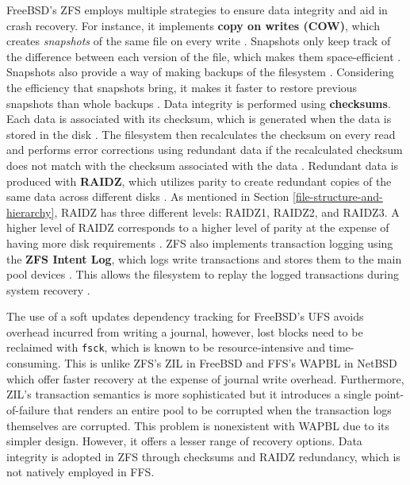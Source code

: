 FreeBSD's ZFS employs multiple strategies to ensure data integrity and aid in crash recovery. For instance, it implements
\textbf{copy on writes (COW)}, which creates \textit{snapshots} of the same file on every write \parencites{pasek2025}{freebsd_zfs}.
Snapshots only keep track of the difference between each version of the file, which makes them space-efficient \parencite{freebsd_zfs}.
Snapshots also provide a way of making backups of the filesystem \parencite{freebsd_zfs}. Considering the efficiency that
snapshots bring, it makes it faster to restore previous snapshots than whole backups \parencite{freebsd_zfs}. Data integrity is
performed using \textbf{checksums}. Each data is associated with its checksum, which is generated when the data is stored in the disk
\parencite{freebsd_zfs}. The filesystem then recalculates the checksum on every read and performs error corrections using
redundant data if the recalculated checksum does not match with the checksum associated with the data \parencite{freebsd_zfs}.
Redundant data is produced with \textbf{RAIDZ}, which utilizes parity to create redundant copies of the same data across
different disks \parencite{freebsd_zfs}. As mentioned in Section \ref{file-structure-and-hierarchy}, RAIDZ has three different levels: RAIDZ1,
RAIDZ2, and RAIDZ3. A higher level of RAIDZ corresponds to a higher level of parity at the expense of having more disk requirements
\parencites{freebsd_zfs}{openzfs_vdev}. ZFS also implements transaction logging using the \textbf{ZFS Intent Log}, which
logs write transactions and stores them to the main pool devices \parencite{khurshid2025}. This allows the filesystem to replay the
logged transactions during system recovery \parencite{khurshid2025}.

The use of a soft updates dependency tracking for FreeBSD's UFS avoids overhead incurred from writing a journal, however, lost blocks
need to be reclaimed with \texttt{fsck}, which is known to be resource-intensive and time-consuming. This is unlike ZFS's ZIL in FreeBSD
and FFS's WAPBL in NetBSD which offer faster recovery at the expense of journal write overhead. Furthermore, ZIL's transaction
semantics is more sophisticated but it introduces a single point-of-failure that renders an entire pool to be corrupted when the
transaction logs themselves are corrupted. This problem is nonexistent with WAPBL due to its simpler design. However, it offers a lesser
range of recovery options. Data integrity is adopted in ZFS through checksums and RAIDZ redundancy, which is not natively employed
in FFS.

